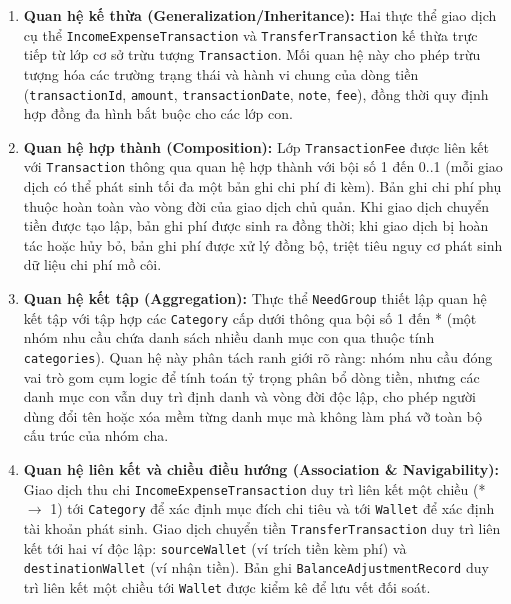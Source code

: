\documentclass[a4paper,12pt]{report}
\newcommand{\passthrough}[1]{#1}
\begin{document}
\begin{enumerate}
\def\labelenumi{\arabic{enumi}.}
\item
  \textbf{Quan hệ kế thừa (Generalization/Inheritance):} Hai thực thể giao dịch cụ thể \passthrough{\lstinline!IncomeExpenseTransaction!} và \passthrough{\lstinline!TransferTransaction!} kế thừa trực tiếp từ lớp cơ sở trừu tượng \passthrough{\lstinline!Transaction!}. Mối quan hệ này cho phép trừu tượng hóa các trường trạng thái và hành vi chung của dòng tiền (\passthrough{\lstinline!transactionId!}, \passthrough{\lstinline!amount!}, \passthrough{\lstinline!transactionDate!}, \passthrough{\lstinline!note!}, \passthrough{\lstinline!fee!}), đồng thời quy định hợp đồng đa hình bắt buộc cho các lớp con.
\item
  \textbf{Quan hệ hợp thành (Composition):} Lớp \passthrough{\lstinline!TransactionFee!} được liên kết với \passthrough{\lstinline!Transaction!} thông qua quan hệ hợp thành với bội số 1 đến 0..1 (mỗi giao dịch có thể phát sinh tối đa một bản ghi chi phí đi kèm). Bản ghi chi phí phụ thuộc hoàn toàn vào vòng đời của giao dịch chủ quản. Khi giao dịch chuyển tiền được tạo lập, bản ghi phí được sinh ra đồng thời; khi giao dịch bị hoàn tác hoặc hủy bỏ, bản ghi phí được xử lý đồng bộ, triệt tiêu nguy cơ phát sinh dữ liệu chi phí mồ côi.
\item
  \textbf{Quan hệ kết tập (Aggregation):} Thực thể \passthrough{\lstinline!NeedGroup!} thiết lập quan hệ kết tập với tập hợp các \passthrough{\lstinline!Category!} cấp dưới thông qua bội số 1 đến * (một nhóm nhu cầu chứa danh sách nhiều danh mục con qua thuộc tính \passthrough{\lstinline!categories!}). Quan hệ này phân tách ranh giới rõ ràng: nhóm nhu cầu đóng vai trò gom cụm logic để tính toán tỷ trọng phân bổ dòng tiền, nhưng các danh mục con vẫn duy trì định danh và vòng đời độc lập, cho phép người dùng đổi tên hoặc xóa mềm từng danh mục mà không làm phá vỡ toàn bộ cấu trúc của nhóm cha.
\item
  \textbf{Quan hệ liên kết và chiều điều hướng (Association \& Navigability):} Giao dịch thu chi \passthrough{\lstinline!IncomeExpenseTransaction!} duy trì liên kết một chiều (* \(\to\) 1) tới \passthrough{\lstinline!Category!} để xác định mục đích chi tiêu và tới \passthrough{\lstinline!Wallet!} để xác định tài khoản phát sinh. Giao dịch chuyển tiền \passthrough{\lstinline!TransferTransaction!} duy trì liên kết tới hai ví độc lập: \passthrough{\lstinline!sourceWallet!} (ví trích tiền kèm phí) và \passthrough{\lstinline!destinationWallet!} (ví nhận tiền). Bản ghi \passthrough{\lstinline!BalanceAdjustmentRecord!} duy trì liên kết một chiều tới \passthrough{\lstinline!Wallet!} được kiểm kê để lưu vết đối soát.
\end{enumerate}
\end{document}

